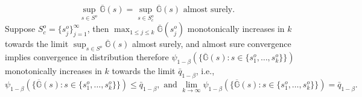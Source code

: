 \documentclass[mnsc,blindrev]{informs4} %
\begin{document}
$$\sup_{s\in S^o}\overline{\mathbb G}(s)=\sup_{s\in S^o_c}\overline{\mathbb G}(s)\text{ almost surely}.$$
Suppose $S^o_c=\{s^o_j\}_{j=1}^{\infty}$, then $\max_{1\leq j\leq k}\overline{\mathbb G}(s^o_j)$ monotonically increases in $k$ towards the limit $\sup_{s\in S^o}\overline{\mathbb G}(s)$ almost surely, and almost sure convergence implies convergence in distribution therefore $\psi_{1-\beta}(\{\overline{\mathbb G}(s):s\in\{s^o_1,\ldots,s^o_k\}\})$ monotonically increases in $k$ towards the limit $\bar{q}_{1-\beta}$, i.e.,
\begin{equation}\label{separability of G}
    \psi_{1-\beta}(\{\overline{\mathbb G}(s):s\in\{s^o_1,\ldots,s^o_k\}\})\leq \bar{q}_{1-\beta},\text{ and }\lim_{k\to\infty}\psi_{1-\beta}(\{\overline{\mathbb G}(s):s\in\{s^o_1,\ldots,s^o_k\}\})=\bar{q}_{1-\beta}.
\end{equation}
\end{document}
